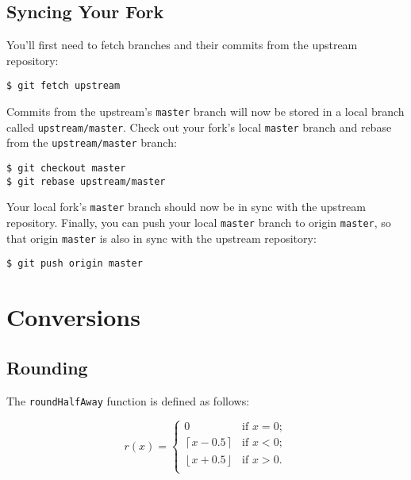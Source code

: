 \documentclass[11pt,a4paper]{article}
\newcommand{\ceil}[1]{\left\lceil #1 \right\rceil}
\newcommand{\floor}[1]{\left\lfloor #1 \right\rfloor}
\begin{document}
\begin{appendices}
\subsection{Syncing Your Fork}

You'll first need to fetch branches and their commits from the upstream repository:

\lstset{language=sh}
\begin{lstlisting}
$ git fetch upstream
\end{lstlisting}

Commits from the upstream's \texttt{master} branch will now be stored in a local branch called
\texttt{upstream/master}. Check out your fork's local \texttt{master} branch and rebase from the
\texttt{upstream/master} branch:

\lstset{language=sh}
\begin{lstlisting}
$ git checkout master
$ git rebase upstream/master
\end{lstlisting}

Your local fork's \texttt{master} branch should now be in sync with the upstream
repository. Finally, you can push your local \texttt{master} branch to origin \texttt{master}, so
that origin \texttt{master} is also in sync with the upstream repository:

\lstset{language=sh}
\begin{lstlisting}
$ git push origin master
\end{lstlisting}

\section{Conversions}

\subsection{Rounding}

The \texttt{roundHalfAway} function is defined as follows:

\[r(x) = \left\{\begin{array}{ll}
  0 & \mbox{if $x = 0$};\\
  \ceil{x-0.5} & \mbox{if $x < 0$};\\
  \floor{x+0.5} & \mbox{if $x > 0$}.\\
\end{array}\right.
\]

\end{appendices}

\newpage
{}


\printglossaries
\end{document}
